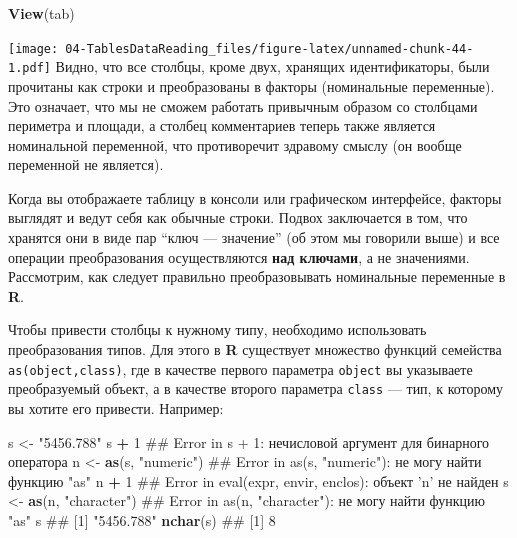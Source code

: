 \documentclass[]{book}
\newenvironment{Shaded}{\begin{snugshade}}{\end{snugshade}}
\newcommand{\KeywordTok}[1]{\textcolor[rgb]{0.13,0.29,0.53}{\textbf{#1}}}
\newcommand{\DecValTok}[1]{\textcolor[rgb]{0.00,0.00,0.81}{#1}}
\newcommand{\StringTok}[1]{\textcolor[rgb]{0.31,0.60,0.02}{#1}}
\newcommand{\OperatorTok}[1]{\textcolor[rgb]{0.81,0.36,0.00}{\textbf{#1}}}
\newcommand{\NormalTok}[1]{#1}
\begin{document}
\begin{Shaded}
\begin{Highlighting}[]
\KeywordTok{View}\NormalTok{(tab)}
\end{Highlighting}
\end{Shaded}

\texttt{[image: 04-TablesDataReading\_files/figure-latex/unnamed-chunk-44-1.pdf]}
Видно, что все столбцы, кроме двух, хранящих идентификаторы, были
прочитаны как строки и преобразованы в факторы (номинальные переменные).
Это означает, что мы не сможем работать привычным образом со столбцами
периметра и площади, а столбец комментариев теперь также является
номинальной переменной, что противоречит здравому смыслу (он вообще
переменной не является).

Когда вы отображаете таблицу в консоли или графическом интерфейсе,
факторы выглядят и ведут себя как обычные строки. Подвох заключается в
том, что хранятся они в виде пар ``ключ --- значение'' (об этом мы
говорили выше) и все операции преобразования осуществляются \textbf{над
ключами}, а не значениями. Рассмотрим, как следует правильно
преобразовывать номинальные переменные в \textbf{R}.

Чтобы привести столбцы к нужному типу, необходимо использовать
преобразования типов. Для этого в \textbf{R} существует множество
функций семейства \texttt{as(object,class)}, где в качестве первого
параметра \texttt{object} вы указываете преобразуемый объект, а в
качестве второго параметра \texttt{class} --- тип, к которому вы хотите
его привести. Например:

\begin{Shaded}
\begin{Highlighting}[]
\NormalTok{s <-}\StringTok{ "5456.788"}
\NormalTok{s }\OperatorTok{+}\StringTok{ }\DecValTok{1}
\NormalTok{## Error in s + 1: нечисловой аргумент для бинарного оператора}
\NormalTok{n <-}\StringTok{ }\KeywordTok{as}\NormalTok{(s, }\StringTok{"numeric"}\NormalTok{)}
\NormalTok{## Error in as(s, "numeric"): не могу найти функцию "as"}
\NormalTok{n }\OperatorTok{+}\StringTok{ }\DecValTok{1}
\NormalTok{## Error in eval(expr, envir, enclos): объект 'n' не найден}
\NormalTok{s <-}\StringTok{ }\KeywordTok{as}\NormalTok{(n, }\StringTok{"character"}\NormalTok{)}
\NormalTok{## Error in as(n, "character"): не могу найти функцию "as"}
\NormalTok{s}
\NormalTok{## [1] "5456.788"}
\KeywordTok{nchar}\NormalTok{(s)}
\NormalTok{## [1] 8}
\end{Highlighting}
\end{Shaded}
\end{document}
